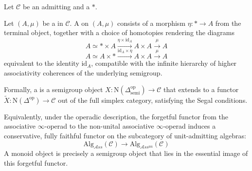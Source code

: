 \begin{definition} \label{definition:monoid_object_in_an_infty_category}
    Let $\mathcal{C}$ be an  admitting  and a  $*$.

    Let $(A, \mu)$ be a  in $\mathcal{C}$. A  on $(A, \mu)$ consists of a morphism $\eta : * \to A$ from the terminal object, together with a choice of homotopies rendering the diagrams
    $$A \simeq * \times A \xrightarrow{\eta \times \mathrm{id}_A} A \times A \xrightarrow{\mu} A$$
    $$A \simeq A \times * \xrightarrow{\mathrm{id}_A \times \eta} A \times A \xrightarrow{\mu} A$$
    equivalent to the identity $\mathrm{id}_A$, compatible with the infinite hierarchy of higher associativity coherences of the underlying semigroup.

    Formally, a  is a semigroup object $X : \mathrm{N}(\Delta_{\mathrm{semi}}^{\mathrm{op}}) \to \mathcal{C}$ that extends to a functor $\tilde{X} : \mathrm{N}(\Delta^{\mathrm{op}}) \to \mathcal{C}$ out of the full simplex category, satisfying the Segal conditions. 

    Equivalently, under the operadic description, the forgetful functor from the associative $\infty$-operad to the non-unital associative $\infty$-operad induces a conservative, fully faithful functor on the subcategory of unit-admitting algebras:
    $$\mathrm{Alg}_{\mathcal{A}ss}(\mathcal{C}) \to \mathrm{Alg}_{\mathcal{A}ss^{\mathrm{nu}}}(\mathcal{C})$$
    A monoid object is precisely a semigroup object that lies in the essential image of this forgetful functor.
\end{definition}